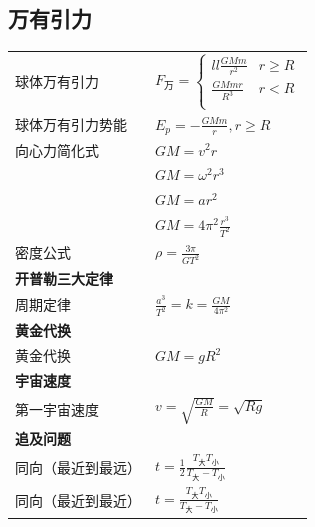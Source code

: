 \subsection{万有引力}
\begin{tabularx}{\columnwidth}{XX}
  球体万有引力    & $ F_{\text{万}}=\left\{
    \begin{aligned}{ll}
      \frac{GMm}{r^2}  & r\ge R \\
      \frac{GMmr}{R^3} & r<R    \\
    \end{aligned}
  \right.$                                                                          \\
  球体万有引力势能  & $E_p=-\frac{GMm}{r},r\ge R$                                           \\
  向心力简化式    & $GM=v^2r$                                                             \\
            & $GM=\omega^2r^3$                                                      \\
            & $GM=ar^2$                                                             \\
            & $GM=4\pi^2\frac{r^3}{T^2}$                                            \\
  密度公式      & $\rho=\frac{3\pi}{GT^2}$                                              \\
  \multicolumn{2}{l}{\textbf{开普勒三大定律}}                                              \\
  周期定律      & $\frac{a^3}{T^2}=k=\frac{GM}{4\pi^2}$                                 \\
  \multicolumn{2}{l}{\textbf{黄金代换}}                                                 \\
  黄金代换      & $GM=gR^2$                                                             \\
  \multicolumn{2}{l}{\textbf{宇宙速度}}                                                 \\
  第一宇宙速度    & $v=\sqrt{\frac{GM}{R}}=\sqrt{Rg}$                                     \\
  \multicolumn{2}{l}{\textbf{追及问题}}                                                 \\
  同向（最近到最远） & $t=\frac12\frac{T_{\text{大}}T_{\text{小}}}{T_{\text{大}}-T_{\text{小}}}$ \\
  同向（最近到最近） & $t=\frac{T_{\text{大}}T_{\text{小}}}{T_{\text{大}}-T_{\text{小}}}$        \\

\end{tabularx}
